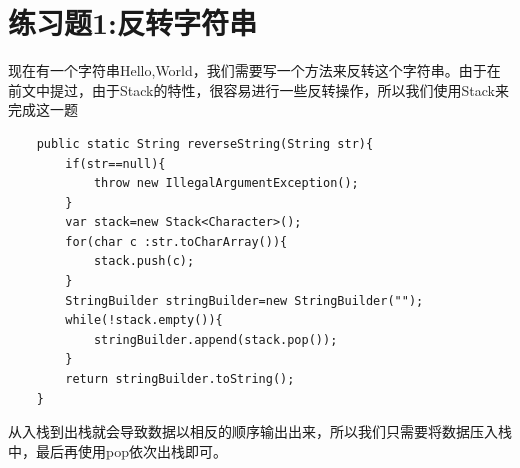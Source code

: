 \documentclass[
	11pt,
	fleqn,
	a4paper,
]{LegrandOrangeBook}
\begin{document}
\section{练习题1:反转字符串}
\begin{example}
    现在有一个字符串Hello,World，我们需要写一个方法来反转这个字符串。由于在前文中提过，由于Stack的特性，很容易进行一些反转操作，所以我们使用Stack来完成这一题
    \begin{verbatim}
    public static String reverseString(String str){
        if(str==null){
            throw new IllegalArgumentException();
        }
        var stack=new Stack<Character>();
        for(char c :str.toCharArray()){
            stack.push(c);
        }
        StringBuilder stringBuilder=new StringBuilder("");
        while(!stack.empty()){
            stringBuilder.append(stack.pop());
        }
        return stringBuilder.toString();
    }
    \end{verbatim}
    从入栈到出栈就会导致数据以相反的顺序输出出来，所以我们只需要将数据压入栈中，最后再使用pop依次出栈即可。
\end{example}
\end{document}
